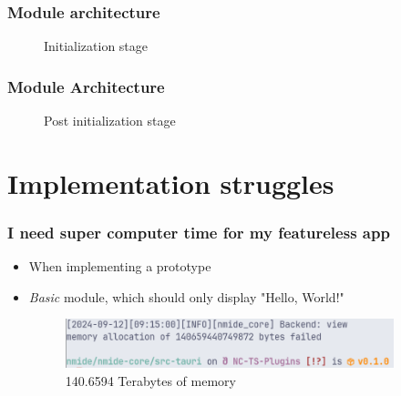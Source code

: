 \begin{frame}
  \frametitle{Module architecture}
  \begin{figure}
    \centering
    
    \caption{Initialization stage}
  \end{figure}
\end{frame}


\begin{frame}
  \frametitle{Module Architecture}
  \begin{figure}
    \centering
    
    \caption{Post initialization stage}
  \end{figure}
\end{frame}

\showlogo

\section{Implementation struggles}
\SectionPage

\begin{frame}
  \frametitle{I need super computer time for my featureless app}
  \begin{itemize}
    \item When implementing a prototype
    \pause
    \item \textit{Basic} module, which should only display "Hello, World!"
    \pause
      \begin{figure}
        \centering
        \includegraphics[width=0.9\textwidth]{./pics/memory-allocation-zoomed.png}
        \caption{140.6594 Terabytes of memory}
      \end{figure}
  \end{itemize}
\end{frame}
